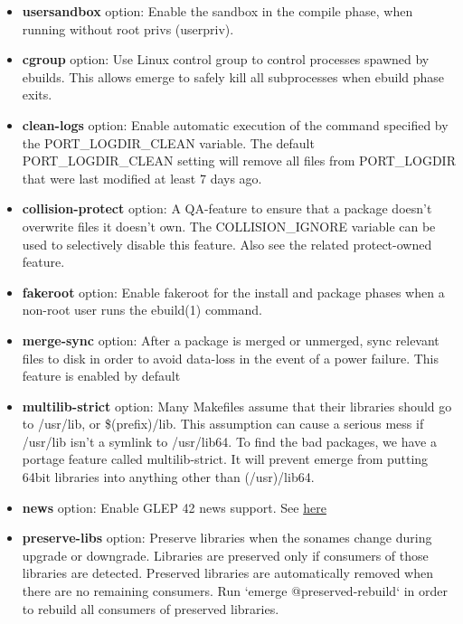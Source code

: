 \documentclass[10pt,a4paper]{article}
\begin{document}
\begin{enumerate}
\begin{enumerate}[label*=\arabic*.]
\begin{itemize}
\begin{itemize}[label={o}]
					\item \textbf{usersandbox} option: Enable the sandbox in the compile phase, when running without root privs (userpriv). 
					
					\item \textbf{cgroup} option: Use Linux control group to control processes spawned by ebuilds. This allows emerge to safely kill all subprocesses when ebuild phase exits.
					
					\item \textbf{clean-logs} option: Enable automatic execution of the command specified by the PORT\_LOGDIR\_CLEAN variable. The default PORT\_LOGDIR\_CLEAN setting will remove all files from PORT\_LOGDIR that were last modified at least 7 days ago.
					
					\item \textbf{collision-protect} option: A QA-feature to ensure that a package doesn't overwrite files it doesn't own. The COLLISION\_IGNORE variable can be used to selectively disable this feature. Also see the related protect-owned feature.
					
					\item \textbf{fakeroot} option: Enable fakeroot for the install and package phases when a non-root user runs the ebuild(1) command.
					
					\item \textbf{merge-sync } option: After a package is merged or unmerged, sync relevant files to disk in order to avoid data-loss in the event of a power failure. This feature is enabled by default
					
					\item \textbf{multilib-strict} option: Many Makefiles assume that their libraries should go to /usr/lib, or \$(prefix)/lib. This assumption can cause a serious mess if /usr/lib isn't a symlink to /usr/lib64. To find the bad packages, we have a portage feature called multilib-strict. It will prevent emerge from putting 64bit libraries into anything other than (/usr)/lib64.
					
					\item \textbf{news} option: Enable GLEP 42 news support. See \href{https://wiki.gentoo.org/wiki/GLEP:42}{here}
					
					\item \textbf{preserve-libs} option: Preserve libraries when the sonames change during upgrade or downgrade. Libraries are preserved only if consumers of those libraries are detected. Preserved libraries are automatically removed when there are no remaining consumers. Run `emerge @preserved-rebuild` in order to rebuild all consumers of preserved libraries. 
					

\end{itemize}
\end{itemize}
\end{enumerate}
\end{enumerate}
\end{document}
